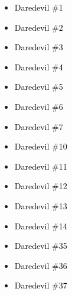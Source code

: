 \documentclass[12pt]{article}
\newcommand{\checkbox}{\raisebox{0.0ex}{\fbox{\rule{0ex}{1.5ex} \rule{1.5ex}{0ex}}}}
\begin{document}
\vspace{0.3cm}
\noindent
\begin{tcolorbox}[
  colback=white!95!gray,
  colframe=black,
  width=\textwidth,
  arc=4mm,
  auto outer arc,
  boxrule=0.8pt,
  left=8pt,right=8pt,top=8pt,bottom=8pt
]
\begin{itemize}[left=0pt,label={\checkbox}]
    \item \textcolor{black}{Daredevil \#1}
    \item \textcolor{black}{Daredevil \#2}
    \item \textcolor{black}{Daredevil \#3}
    \item \textcolor{black}{Daredevil \#4}
    \item \textcolor{black}{Daredevil \#5}
    \item \textcolor{black}{Daredevil \#6}
    \item \textcolor{black}{Daredevil \#7}
    \item \textcolor{black}{Daredevil \#10}
    \item \textcolor{black}{Daredevil \#11}
    \item \textcolor{black}{Daredevil \#12}
    \item \textcolor{black}{Daredevil \#13}
    \item \textcolor{black}{Daredevil \#14}
    \item \textcolor{black}{Daredevil \#35}
    \item \textcolor{black}{Daredevil \#36}
    \item \textcolor{black}{Daredevil \#37}
\end{itemize}
\end{tcolorbox}

\newpage
{}
\end{document}
